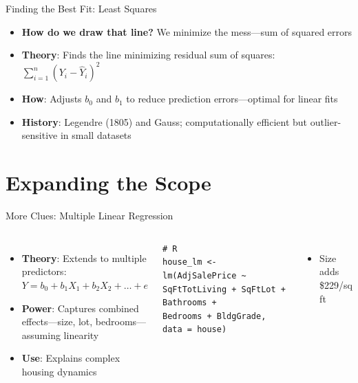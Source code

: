 \documentclass{beamer}
\begin{document}
	
	\begin{frame}{Finding the Best Fit: Least Squares}
			\begin{itemize}
				 \item \textbf{How do we draw that line?} We minimize the mess—sum of squared errors
				\item \textbf{Theory}: Finds the line minimizing residual sum of squares: $\sum_{i=1}^n (Y_i - \hat{Y}_i)^2$
				\item \textbf{How}: Adjusts $b_0$ and $b_1$ to reduce prediction errors—optimal for linear fits
				\item \textbf{History}: Legendre (1805) and Gauss; computationally efficient but outlier-sensitive in small datasets
			\end{itemize}
		\end{frame}
		
	


	
	
	\section{Expanding the Scope}
	
	\begin{frame}[fragile]{More Clues: Multiple Linear Regression}
		\begin{columns}
			\begin{itemize}
				\item \textbf{Theory}: Extends to multiple predictors: $Y = b_0 + b_1X_1 + b_2X_2 + \dots + e$
				\item \textbf{Power}: Captures combined effects—size, lot, bedrooms—assuming linearity
				\item \textbf{Use}: Explains complex housing dynamics
			\end{itemize}
			\begin{lstlisting}
# R 
house_lm <- lm(AdjSalePrice ~ SqFtTotLiving + SqFtLot + Bathrooms +
Bedrooms + BldgGrade, data = house)
			\end{lstlisting}
			\begin{itemize}
				\item Size adds \$229/sq ft
			\end{itemize}
		\end{columns}
	\end{frame}
	

\end{document}
